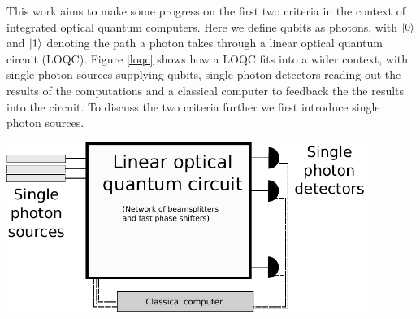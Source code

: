 This work aims to make some progress on the first two criteria in the context of integrated optical quantum computers. Here we define qubits as photons, with $\ket{0}$ and $\ket{1}$ denoting the path a photon takes through a linear optical quantum circuit (LOQC). Figure \ref{loqc} shows how a LOQC fits into a wider context, with single photon sources supplying qubits, single photon detectors reading out the results of the computations and a classical computer to feedback the the results into the circuit. To discuss the two criteria further we first introduce single photon sources.

\begingroup
    \centering  
    \includegraphics[width=12cm]{img/theory/loqc.pdf}
     \vspace{3pt} \label{loqc}
\endgroup




